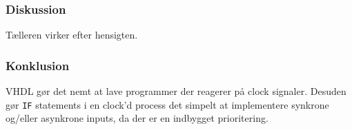 {    %

    \subsubsection{Diskussion}

    Tælleren virker efter hensigten.

    \subsubsection{Konklusion}

    VHDL gør det nemt at lave programmer der reagerer på clock signaler.
    Desuden gør \texttt{IF} statements i en clock'd process det simpelt at implementere synkrone og/eller asynkrone inputs, da der er en indbygget prioritering.
}